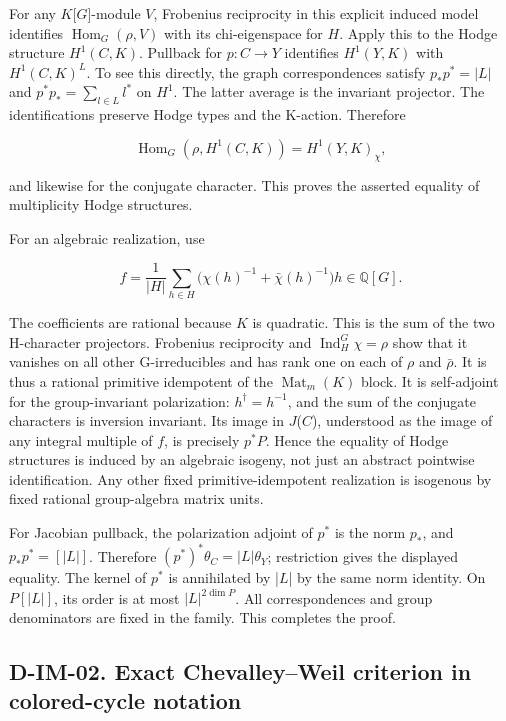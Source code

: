For any \(K\)[\(G\)]-module \(V\), Frobenius reciprocity in this explicit induced model identifies \(\operatorname{Hom}_G(\rho,V)\) with its chi-eigenspace for \(H\). Apply this to the Hodge structure \(H^1(C,K)\). Pullback for \(p:C\to Y\) identifies \(H^1(Y,K)\) with \(H^1(C,K)^L\). To see this directly, the graph correspondences satisfy \(p_*p^*=|L|\) and \(p^*p_*=\sum_{l\in L}l^*\) on \(H^1\). The latter average is the invariant projector. The identifications preserve Hodge types and the K-action. Therefore

\[
\operatorname{Hom}_G(\rho,H^1(C,K))=H^1(Y,K)_\chi,
\]

and likewise for the conjugate character. This proves the asserted equality of multiplicity Hodge structures.

For an algebraic realization, use

\[
f=\frac1{|H|}\sum_{h\in H}\bigl(\chi(h)^{-1}+\bar\chi(h)^{-1}\bigr)h\in\mathbb Q[G].
\]

The coefficients are rational because \(K\) is quadratic. This is the sum of the two H-character projectors. Frobenius reciprocity and \(\operatorname{Ind}_H^G\chi=\rho\) show that it vanishes on all other G-irreducibles and has rank one on each of \(\rho\) and \(\bar\rho\). It is thus a rational primitive idempotent of the \(\operatorname{Mat}_m(K)\) block. It is self-adjoint for the group-invariant polarization: \(h^\dagger=h^{-1}\), and the sum of the conjugate characters is inversion invariant. Its image in \(J\)(\(C\)), understood as the image of any integral multiple of \(f\), is precisely \(p^*P\). Hence the equality of Hodge structures is induced by an algebraic isogeny, not just an abstract pointwise identification. Any other fixed primitive-idempotent realization is isogenous by fixed rational group-algebra matrix units.

For Jacobian pullback, the polarization adjoint of \(p^*\) is the norm \(p_*\), and \(p_*p^*=[|L|]\). Therefore \((p^*)^*\theta_C=|L|\theta_Y\); restriction gives the displayed equality. The kernel of \(p^*\) is annihilated by |\(L\)| by the same norm identity. On \(P[|L|]\), its order is at most \(|L|^{2\dim P}\). All correspondences and group denominators are fixed in the family. This completes the proof.

\subsection{D-IM-02. Exact Chevalley--Weil criterion in colored-cycle notation}
\label{D-IM-02}

